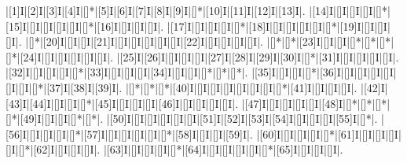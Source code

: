 \begin{Puzzle}{15}{15}
|[1]I|[2]I|[3]I|[4]I|[]*|[5]I|[6]I|[7]I|[8]I|[9]I|[]*|[10]I|[11]I|[12]I|[13]I|.
|[14]I|[]I|[]I|[]I|[]*|[15]I|[]I|[]I|[]I|[]I|[]*|[16]I|[]I|[]I|[]I|.
|[17]I|[]I|[]I|[]I|[]*|[18]I|[]I|[]I|[]I|[]I|[]*|[19]I|[]I|[]I|[]I|.
|[]*|[20]I|[]I|[]I|[21]I|[]I|[]I|[]I|[]I|[]I|[22]I|[]I|[]I|[]I|[]I|.
|[]*|[]*|[23]I|[]I|[]I|[]*|[]*|[]*|[]*|[24]I|[]I|[]I|[]I|[]I|[]I|.
|[25]I|[26]I|[]I|[]I|[]I|[27]I|[28]I|[29]I|[30]I|[]*|[31]I|[]I|[]I|[]I|[]I|.
|[32]I|[]I|[]I|[]I|[]*|[33]I|[]I|[]I|[]I|[34]I|[]I|[]I|[]*|[]*|[]*|.
|[35]I|[]I|[]I|[]*|[36]I|[]I|[]I|[]I|[]I|[]I|[]I|[]*|[37]I|[38]I|[39]I|.
|[]*|[]*|[]*|[40]I|[]I|[]I|[]I|[]I|[]I|[]I|[]*|[41]I|[]I|[]I|[]I|.
|[42]I|[43]I|[44]I|[]I|[]I|[]*|[45]I|[]I|[]I|[]I|[46]I|[]I|[]I|[]I|[]I|.
|[47]I|[]I|[]I|[]I|[]I|[48]I|[]*|[]*|[]*|[]*|[49]I|[]I|[]I|[]*|[]*|.
|[50]I|[]I|[]I|[]I|[]I|[]I|[51]I|[52]I|[53]I|[54]I|[]I|[]I|[]I|[55]I|[]*|.
|[56]I|[]I|[]I|[]I|[]*|[57]I|[]I|[]I|[]I|[]I|[]*|[58]I|[]I|[]I|[59]I|.
|[60]I|[]I|[]I|[]I|[]*|[61]I|[]I|[]I|[]I|[]I|[]*|[62]I|[]I|[]I|[]I|.
|[63]I|[]I|[]I|[]I|[]*|[64]I|[]I|[]I|[]I|[]I|[]*|[65]I|[]I|[]I|[]I|.
\end{Puzzle}